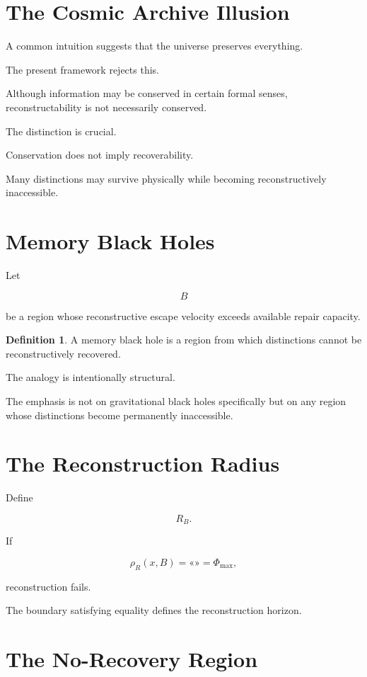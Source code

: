 \documentclass[12pt,oneside]{book}
\theoremstyle{plain} \newtheorem{theorem}{Theorem}[chapter] \newtheorem{lemma}[theorem]{Lemma} \newtheorem{proposition}[theorem]{Proposition} \newtheorem{corollary}[theorem]{Corollary}
\theoremstyle{definition} \newtheorem{definition}[theorem]{Definition} \newtheorem{axiom}[theorem]{Axiom} \newtheorem{construction}[theorem]{Construction}
\theoremstyle{remark} \newtheorem{remark}[theorem]{Remark} \newtheorem{example}[theorem]{Example}
\begin{document}
\section{The Cosmic Archive Illusion}

A common intuition suggests that the universe preserves everything.

The present framework rejects this.

Although information may be conserved in certain formal senses, reconstructability is not necessarily conserved.

The distinction is crucial.

Conservation does not imply recoverability.

Many distinctions may survive physically while becoming reconstructively inaccessible.

\section{Memory Black Holes}

Let

\[
B
\]

be a region whose reconstructive escape velocity exceeds available repair capacity.

\begin{definition}

A memory black hole is a region from which distinctions cannot be reconstructively recovered.

\end{definition}

The analogy is intentionally structural.

The emphasis is not on gravitational black holes specifically but on any region whose distinctions become permanently inaccessible.

\section{The Reconstruction Radius}

Define

\[
R_B.
\]

If

\[
\rho_R(x,B)
=
«»
=
\Phi_{\max},
\]

reconstruction fails.

The boundary satisfying equality defines the reconstruction horizon.

\section{The No-Recovery Region}
\end{document}
